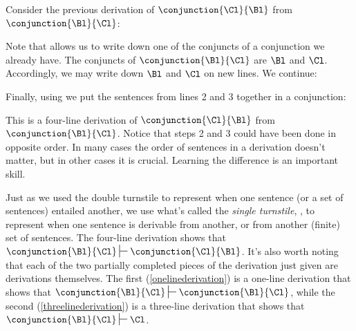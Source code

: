 Consider the previous derivation of $\conjunction{\Cl}{\Bl}$ from $\conjunction{\Bl}{\Cl}$:
\begin{gproof}[\label{onelinederivation}]
\end{gproof}
\noindent{}Note that  allows us to write down one of the conjuncts of a conjunction we already have. 
The conjuncts of $\conjunction{\Bl}{\Cl}$ are $\Bl$ and $\Cl$. 
Accordingly, we may write down $\Bl$ and $\Cl$ on new lines. 
We continue:
\begin{gproof}[\label{threelinederivation}]
\end{gproof}
\noindent{}Finally, using  we put the sentences from lines 2 and 3 together in a conjunction:
\begin{gproof}[\label{simpleconjunction}]
\end{gproof}
\noindent{}This is a four-line derivation of $\conjunction{\Cl}{\Bl}$ from $\conjunction{\Bl}{\Cl}$.
Notice that steps 2 and 3 could have been done in opposite order.
In many cases the order of sentences in a derivation doesn't matter, but in other cases it is crucial.
Learning the difference is an important skill.

Just as we used the double turnstile to represent when one sentence (or a set of sentences) entailed another, we use what's called the \emph{single turnstile}, \mention{\:$\sststile{}{}\:$}, to represent when one sentence is derivable from another, or from another (finite) set of sentences. 
The four-line derivation shows that $\conjunction{\Bl}{\Cl}\sststile{}{}\conjunction{\Cl}{\Bl}$. 
It's also worth noting that each of the two partially completed pieces of the derivation just given are derivations themselves. 
The first (\ref{onelinederivation}) is a one-line derivation that shows that $\conjunction{\Bl}{\Cl}\sststile{}{}\conjunction{\Bl}{\Cl}$, while the second (\ref{threelinederivation}) is a three-line derivation that shows that $\conjunction{\Bl}{\Cl}\sststile{}{}\Cl$.

